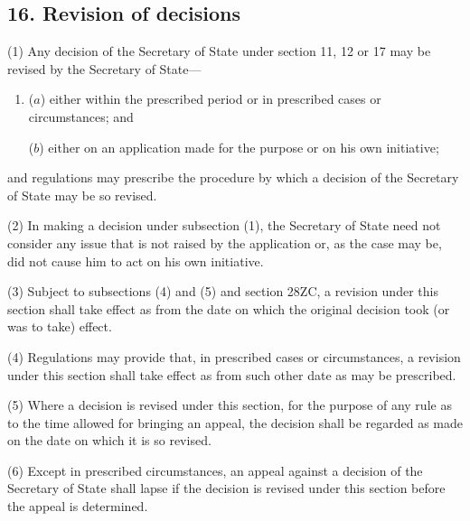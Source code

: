 \documentclass[12pt,a4paper]{article}
\begin{document}
\subsection{16. Revision of decisions}

(1) Any decision of the Secretary of State under section 11, 12 or 17 may be revised by the Secretary of State—
\begin{enumerate}\item[]
($a$) either within the prescribed period or in prescribed cases or circumstances; and

($b$) either on an application made for the purpose or on his own initiative;
\end{enumerate}
and regulations may prescribe the procedure by which a decision of the Secretary of State may be so revised.

(2) In making a decision under subsection (1), the Secretary of State need not consider any issue that is not raised by the application or, as the case may be, did not cause him to act on his own initiative.

(3) Subject to subsections (4) and (5) and section 28ZC, a revision under this section shall take effect as from the date on which the original decision took (or was to take) effect.

(4) Regulations may provide that, in prescribed cases or circumstances, a revision under this section shall take effect as from such other date as may be prescribed.

(5) Where a decision is revised under this section, for the purpose of any rule as to the time allowed for bringing an appeal, the decision shall be regarded as made on the date on which it is so revised.

(6) Except in prescribed circumstances, an appeal against a decision of the Secretary of State shall lapse if the decision is revised under this section before the appeal is determined.
\end{document}
